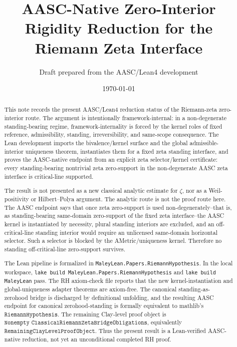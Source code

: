 \documentclass[11pt]{article}
\title{AASC-Native Zero-Interior Rigidity Reduction for the Riemann Zeta Interface}
\author{Draft prepared from the AASC/Lean4 development}
\date{\today}
\begin{document}
\maketitle

\begin{abstract}
This note records the present AASC/Lean4 reduction status of the Riemann-zeta
zero-interior route.  The argument is intentionally framework-internal: in a
non-degenerate standing-bearing regime, framework-internality is forced by the
kernel roles of fixed reference, admissibility, standing, irreversibility, and
same-scope consequence.  The Lean development imports the bivalence/kernel
surface and the global admissible-interior uniqueness theorem, instantiates
them for a fixed zeta standing interface, and proves the AASC-native endpoint
from an explicit zeta selector/kernel certificate:
every standing-bearing nontrivial zeta zero-support in the non-degenerate AASC
zeta interface is critical-line supported.

The result is not presented as a new classical analytic estimate for
\(\zeta\), nor as a Weil-positivity or Hilbert--Polya argument.  The analytic
route is not the proof route here.  The AASC endpoint says that once zeta
zero-support is used non-degenerately--that is, as standing-bearing
same-domain zero-support of the fixed zeta interface--the AASC kernel is
instantiated by necessity, plural standing interiors are excluded, and an
off-critical-line standing interior would require an unlicensed same-domain
horizontal selector.  Such a selector is blocked by the AMetric/uniqueness
kernel.  Therefore no standing off-critical-line zero-support survives.

The Lean pipeline is formalized in
\texttt{MaleyLean.Papers.RiemannHypothesis}.  In the local workspace,
\texttt{lake build MaleyLean.Papers.RiemannHypothesis} and
\texttt{lake build MaleyLean} pass.  The RH axiom-check file reports that the
new kernel-instantiation and global-uniqueness adapter theorems are
axiom-free.  The canonical standing-as-zerohood bridge is discharged by
definitional unfolding, and the resulting AASC endpoint for canonical
zerohood-standing is formally equivalent to mathlib's
\(\texttt{RiemannHypothesis}\).  The remaining Clay-level proof object is
\(\texttt{Nonempty ClassicalRiemannZetaBridgeObligations}\), equivalently
\(\texttt{RemainingClayLevelProofObject}\).  Thus the present result is a
Lean-verified AASC-native reduction, not yet an unconditional completed RH
proof.
\end{abstract}
\end{document}
